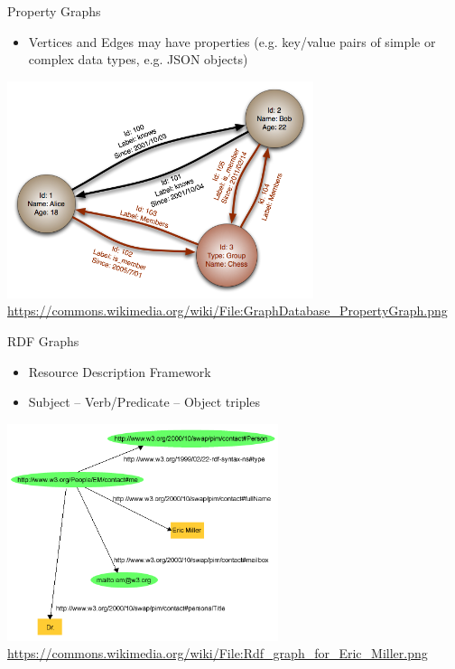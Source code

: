 \documentclass[ignorenonframetext,xcolor=x11names]{beamer}
\begin{document}
\begin{frame}{Property Graphs}
\begin{itemize}
	\item Vertices and Edges may have properties (e.g. key/value pairs of simple or complex data types, e.g. JSON objects)
\end{itemize}

\centering
\includegraphics[height=2.5in]{GraphDatabase_PropertyGraph.png}
\tiny{\url{https://commons.wikimedia.org/wiki/File:GraphDatabase_PropertyGraph.png}}
\end{frame}

\begin{frame}{RDF Graphs}
\begin{itemize}
	\item Resource Description Framework
	\item Subject -- Verb/Predicate -- Object triples
\end{itemize}

\centering
\includegraphics[height=2.5in]{rdf.png}
\tiny{\url{https://commons.wikimedia.org/wiki/File:Rdf_graph_for_Eric_Miller.png}}
\end{frame}
\end{document}
